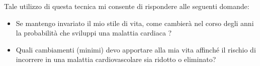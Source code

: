 \begin{flushleft}
Tale utilizzo di questa tecnica mi consente di rispondere alle seguenti domande:
\begin{itemize}
    \item Se mantengo invariato il mio stile di vita, come cambierà nel corso degli anni la probabilità che sviluppi una malattia cardiaca ?
    \item Quali cambiamenti (minimi) devo apportare alla mia vita affinché il rischio di incorrere in una malattia cardiovascolare sia ridotto o eliminato?
\end{itemize}

\end{flushleft}


